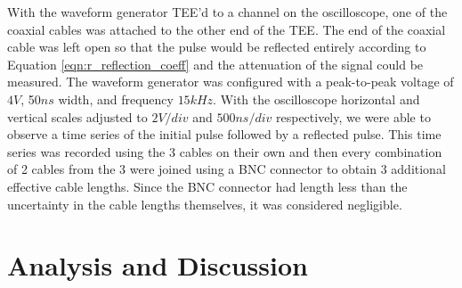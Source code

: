 \documentclass[
	a4paper, %
	10pt, %
	twoside, %
]{journal}
\begin{document}
With the waveform generator TEE'd to a channel on the oscilloscope, one of the coaxial cables was attached to the other end of the TEE. The end of the coaxial cable was left open so that the pulse would be reflected entirely according to Equation \ref{eqn:r_reflection_coeff} and the attenuation of the signal could be measured. The waveform generator was configured with a peak-to-peak voltage of $4\unit{V}$, 50$\unit{ns}$ width, and frequency $15 \unit{kHz}$. With the oscilloscope horizontal and vertical scales adjusted to $2\unit{V/div}$ and $500\unit{ns/div}$ respectively, we were able to observe a time series of the initial pulse followed by a reflected pulse. This time series was recorded using the 3 cables on their own and then every combination of 2 cables from the 3 were joined using a BNC connector to obtain 3 additional effective cable lengths. Since the BNC connector had length less than the uncertainty in the cable lengths themselves, it was considered negligible. 







\section{Analysis and Discussion}
\end{document}

